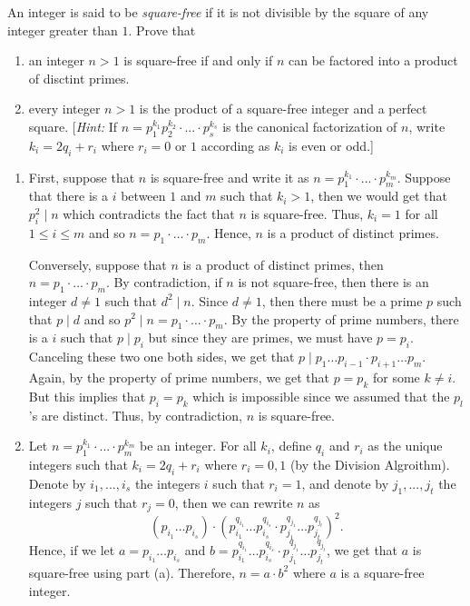 \begin{exercise}
    An integer is said to be \textit{square-free} if it is not divisible by the square of any integer greater than $1$. Prove that
    \begin{enumerate}
        \item an integer $n> 1$ is square-free if and only if $n$ can be factored into a product of disctint primes.
        \item every integer $n > 1$ is the product of a square-free integer and a perfect square. [\textit{Hint:} If $n = p_1^{k_1}p_2^{k_2}\cdot ... \cdot p_s^{k_s}$ is the canonical factorization of $n$, write $k_i = 2q_i + r_i$ where $r_i = 0$ or $1$ according as $k_i$ is even or odd.]
    \end{enumerate}
\end{exercise}

\begin{solution}
    \begin{enumerate}
        \item First, suppose that $n$ is square-free and write it as $n = p_1^{k_1}\cdot ... \cdot p_m^{k_m}$. Suppose that there is a $i$ between $1$ and $m$ such that $k_i > 1$, then we would get that $p_i^2 \mid n$ which contradicts the fact that $n$ is square-free. Thus, $k_i = 1$ for all $1 \leq i \leq m$ and so $n = p_1 \cdot \dots \cdot p_m$. Hence, $n$ is a product of distinct primes.
        
        Conversely, suppose that $n$ is a product of distinct primes, then $n = p_1 \cdot \dots \cdot p_m$. By contradiction, if $n$ is not square-free, then there is an integer $d \neq 1$ such that $d^2 \mid n$. Since $d \neq 1$, then there must be a prime $p$ such that $p \mid d$ and so $p^2 \mid n = p_1 \cdot \dots \cdot p_m$. By the property of prime numbers, there is a $i$ such that $p \mid p_i$ but since they are primes, we must have $p = p_i$. Canceling these two one both sides, we get that $p \mid p_1 \dots p_{i-1} \cdot p_{i+1} \dots p_m$. Again, by the property of prime numbers, we get that $p = p_k$ for some $k \neq i$. But this implies that $p_i = p_k$ which is impossible since we assumed that the $p_l$'s are distinct. Thus, by contradiction, $n$ is square-free.
        \item Let $n = p_1^{k_1}\cdot ... \cdot p_m^{k_m}$ be an integer. For all $k_i$, define $q_i$ and $r_i$ as the unique integers such that $k_i = 2q_i + r_i$ where $r_i = 0,1$ (by the Division Algroithm). Denote by $i_1, ..., i_s$ the integers $i$ such that $r_i = 1$, and denote by $j_1, ..., j_t$ the integers $j$ such that $r_j = 0$, then we can rewrite $n$ as
        $$(p_{i_1} \dots p_{i_s}) \cdot (p_{i_1}^{q_{i_1}} \dots p_{i_s}^{q_{i_s}} \cdot p_{j_1}^{q_{j_1}} \dots p_{j_t}^{q_{j_t}})^2.$$
        Hence, if we let $a = p_{i_1} \dots p_{i_s}$ and $b = p_{i_1}^{q_{i_1}} \dots p_{i_s}^{q_{i_s}} \cdot p_{j_1}^{q_{j_1}} \dots p_{j_t}^{q_{j_t}}$, we get that $a$ is square-free using part (a). Therefore, $n = a\cdot b^2$ where $a$ is a square-free integer.
    \end{enumerate}
\end{solution}


